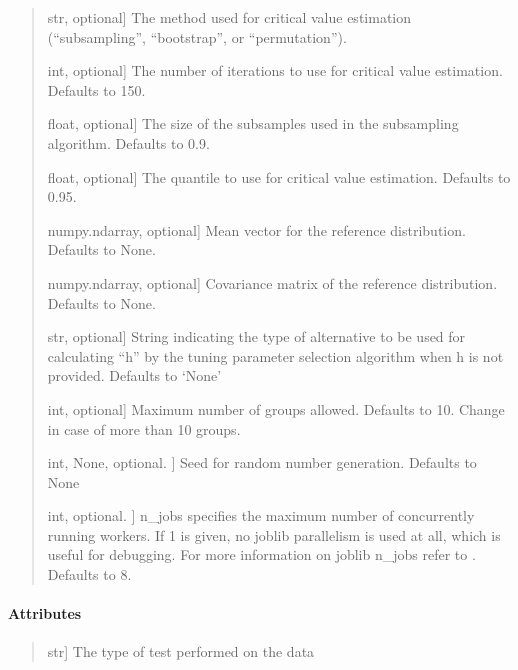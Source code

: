 \documentclass[letterpaper,10pt,english,openany,oneside]{sphinxmanual}
\begin{document}
\begin{fulllineitems}
\begin{quote}
\begin{description}
\sphinxlineitem{method}{[}str, optional{]}
\sphinxAtStartPar
The method used for critical value estimation (“subsampling”, “bootstrap”, 
or “permutation”).

\sphinxlineitem{num\_iter}{[}int, optional{]}
\sphinxAtStartPar
The number of iterations to use for critical value estimation. Defaults to 150.

\sphinxlineitem{b}{[}float, optional{]}
\sphinxAtStartPar
The size of the subsamples used in the subsampling algorithm. Defaults to 0.9.

\sphinxlineitem{quantile}{[}float, optional{]}
\sphinxAtStartPar
The quantile to use for critical value estimation. Defaults to 0.95.

\sphinxlineitem{mu\_hat}{[}numpy.ndarray, optional{]}
\sphinxAtStartPar
Mean vector for the reference distribution. Defaults to None.

\sphinxlineitem{sigma\_hat}{[}numpy.ndarray, optional{]}
\sphinxAtStartPar
Covariance matrix of the reference distribution. Defaults to None.

\sphinxlineitem{alternative}{[}str, optional{]}
\sphinxAtStartPar
String indicating the type of alternative to be used for calculating “h” 
by the tuning parameter selection algorithm when h is not provided.
Defaults to ‘None’

\sphinxlineitem{k\_threshold}{[}int, optional{]}
\sphinxAtStartPar
Maximum number of groups allowed. Defaults to 10. Change in case of more than 10 groups.

\sphinxlineitem{random\_state}{[}int, None, optional. {]}
\sphinxAtStartPar
Seed for random number generation. Defaults to None

\sphinxlineitem{n\_jobs}{[}int, optional. {]}
\sphinxAtStartPar
n\_jobs specifies the maximum number of concurrently 
running workers. If 1 is given, no joblib parallelism 
is used at all, which is useful for debugging. For more 
information on joblib n\_jobs refer to \sphinxhyphen{} 
.
Defaults to 8.

\end{description}
\end{quote}


\paragraph{Attributes}
\label{\detokenize{api_reference/generated/QuadratiK.kernel_test.KernelTest:attributes}}\begin{quote}
\begin{description}
\sphinxlineitem{test\_type\_}{[}str{]}
\sphinxAtStartPar
The type of test performed on the data


\end{description}
\end{quote}
\end{fulllineitems}
\end{document}
